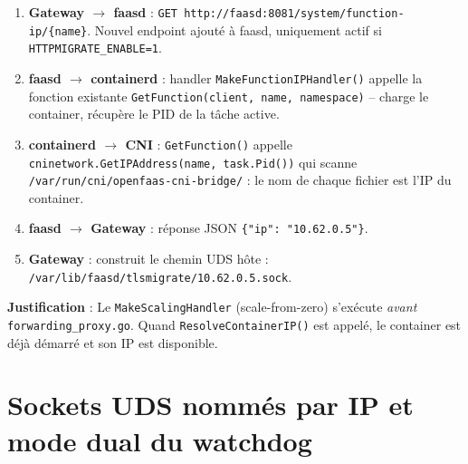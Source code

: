 \documentclass[11pt,a4paper]{article}
\begin{document}
\begin{enumerate}[label=\textbf{(\arabic*)}, leftmargin=*]
  \item \textbf{Gateway $\to$ faasd} : \texttt{GET http://faasd:8081/system/function-ip/\{name\}}.
    Nouvel endpoint ajouté à faasd, uniquement actif si \texttt{HTTPMIGRATE\_ENABLE=1}.
  \item \textbf{faasd $\to$ containerd} : handler \texttt{MakeFunctionIPHandler()} appelle la
    fonction existante \texttt{GetFunction(client, name, namespace)} -- charge le container,
    récupère le PID de la tâche active.
  \item \textbf{containerd $\to$ CNI} : \texttt{GetFunction()} appelle
    \texttt{cninetwork.GetIPAddress(name, task.Pid())} qui scanne
    \texttt{/var/run/cni/openfaas-cni-bridge/} : le nom de chaque fichier est l'IP du container.
  \item \textbf{faasd $\to$ Gateway} : réponse JSON \texttt{\{"ip": "10.62.0.5"\}}.
  \item \textbf{Gateway} : construit le chemin UDS hôte :
    \texttt{/var/lib/faasd/tlsmigrate/10.62.0.5.sock}.
\end{enumerate}

\textbf{Justification} : Le \texttt{MakeScalingHandler} (scale-from-zero) s'exécute
\emph{avant} \texttt{forwarding\_proxy.go}. Quand \texttt{ResolveContainerIP()} est appelé,
le container est déjà démarré et son IP est disponible.


\section{Sockets UDS nommés par IP et mode dual du watchdog}
\end{document}
